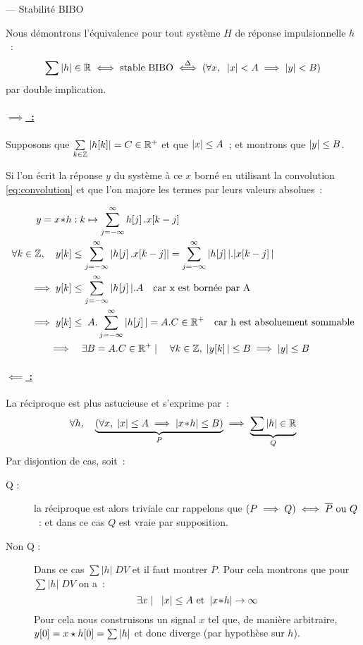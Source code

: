 \begin{demo} --- Stabilité BIBO

  
  Nous démontrons l'équivalence pour tout système $H$ de réponse impulsionnelle $h$~:
  $$ \sum \left|h\right|\in\mathbb{R} \iff \text{stable BIBO} \overset{\Delta}{\iff} \left(\forall x, \;\;\left|x\right|<A \implies \left|y\right|<B\right)$$  par
  double implication.
  
  \paragraph{\underline{$\implies$~:}}
  Supposons que $\sum\limits_{k\in\mathbb{Z}} \left|h\!\left[k\right]\right|=C\in\mathbb{R}^+$
  et que $\left|x\right|\leq A$~; et montrons que $\left|y\right|\leq B$.

  Si l'on écrit la réponse $y$ du système à ce $x$ borné en utilisant
  la convolution \eqref{eq:convolution} et que l'on majore les termes
  par leurs valeurs absolues~:

  \begin{align*}
    y=x\conv{}h &: k\mapsto \somme{j=-\infty}{\infty}{h\ded{j}.x\ded{k-j}} \\
    \forall k\in\Z,\quad y\ded{k} & \leq \somme{j=-\infty}{\infty}{\left|h\ded{j}.x\ded{k-j}\right|} = \somme{j=-\infty}{\infty}{|h\ded{j}|.|x\ded{k-j}|}\\
    \implies  y\ded{k} & \leq \somme{j=-\infty}{\infty}{|h\ded{j}| . A}\quad \text{car x est bornée par A}\\
    \implies  y\ded{k} & \leq \;A.\somme{j=-\infty}{\infty}{|h\ded{j}|} = A.C \in \R^+\quad \text{car h est absoluement sommable}\\
    \implies & \quad\exists B=A.C\in\R^+ \mathrel{}\mid\mathrel{}\quad \forall k\in\Z, \; |y\ded{k}|\leq B \implies \abs{y}\leq B
  \end{align*}

  \paragraph{\underline{$\impliedby$ :}}
  La réciproque est plus astucieuse et s'exprime par~:
  $$\forall h,\quad \underbrace{\left(\forall x,\; \left|x\right|\leq A \implies \left|x\!\ast\! h\right|\leq B\right)}_{P} \implies \underbrace{\sum|h|\in\mathbb{R}}_{Q}$$
  Par disjontion de cas, soit~:
  \begin{description}
  \item[Q :] la réciproque est alors triviale car rappelons que
    $\left(P\implies Q\right)\iff \overline{P} \text{ ou } Q$~: et dans ce cas
    $Q$ est vraie par supposition.
  \item[Non Q :] Dans ce cas $\sum|h|\; DV$ et il faut montrer
    $\overline{P}$. Pour cela montrons que pour $\sum|h|\; DV$ on
    a~:
    $$\exists x \mathrel{}\mid\mathrel{} \;\; \left|x\right|\leq A \text{ et } \left|x\!\ast\!
      h\right|\to\infty $$ Pour cela nous construisons un signal $x$ tel
    que, de manière arbitraire,
    $y\!\left[0\right]=x\star h\!\left[0\right] = \sum\left|h\right|$ et donc diverge (par
    hypothèse sur $h$).


\end{description}
\end{demo}

